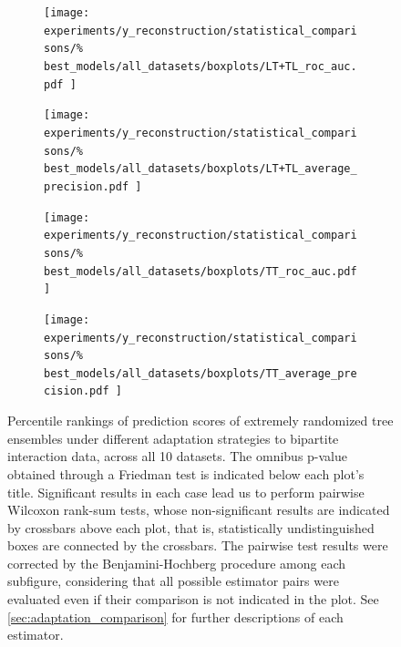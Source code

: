\begin{figure}[tbh]
    \centering
    \begin{subfigure}{0.49\textwidth}
        \texttt{[image: 
            experiments/y\_reconstruction/statistical\_comparisons/\%
            best\_models/all\_datasets/boxplots/LT+TL\_roc\_auc.pdf
        ]}
    \end{subfigure}
    \begin{subfigure}{0.49\textwidth}
        \texttt{[image: 
            experiments/y\_reconstruction/statistical\_comparisons/\%
            best\_models/all\_datasets/boxplots/LT+TL\_average\_precision.pdf
        ]}
    \end{subfigure}

    \begin{subfigure}{0.49\textwidth}
        \texttt{[image: 
            experiments/y\_reconstruction/statistical\_comparisons/\%
            best\_models/all\_datasets/boxplots/TT\_roc\_auc.pdf
        ]}
    \end{subfigure}
    \begin{subfigure}{0.49\textwidth}
        \texttt{[image: 
            experiments/y\_reconstruction/statistical\_comparisons/\%
            best\_models/all\_datasets/boxplots/TT\_average\_precision.pdf
        ]}
    \end{subfigure}
    \caption{
        Percentile rankings of prediction scores of extremely randomized tree ensembles under different adaptation strategies to bipartite interaction data, across all 10 datasets.
        The omnibus p-value obtained through a Friedman test is indicated below each plot's title. Significant results in each case lead us to perform pairwise Wilcoxon rank-sum tests, whose non-significant results are indicated by crossbars above each plot, that is, statistically undistinguished boxes are connected by the crossbars. The pairwise test results were corrected by the Benjamini-Hochberg procedure among each subfigure, considering that all possible estimator pairs were evaluated even if their comparison is not indicated in the plot. See \autoref{sec:adaptation_comparison} for further descriptions of each estimator.
    }
    \label{fig:brf_vs_bxt}
\end{figure}



%     


